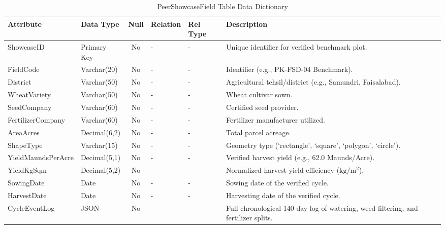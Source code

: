\documentclass{FastFyp}
\begin{document}
\begin{table}[H]
\footnotesize
\centering
\caption{PeerShowcaseField Table Data Dictionary}
\label{tab:showcase_table}
\begin{tabular}{|l|l|c|l|l|p{4.5cm}|}
\hline
\textbf{Attribute} & \textbf{Data Type} & \textbf{Null} & \textbf{Relation} & \textbf{Rel Type} & \textbf{Description} \\ \hline
ShowcaseID & Primary Key & No & - & - & Unique identifier for verified benchmark plot. \\ \hline
FieldCode & Varchar(20) & No & - & - & Identifier (e.g., PK-FSD-04 Benchmark). \\ \hline
District & Varchar(50) & No & - & - & Agricultural tehsil/district (e.g., Samundri, Faisalabad). \\ \hline
WheatVariety & Varchar(50) & No & - & - & Wheat cultivar sown. \\ \hline
SeedCompany & Varchar(60) & No & - & - & Certified seed provider. \\ \hline
FertilizerCompany & Varchar(60) & No & - & - & Fertilizer manufacturer utilized. \\ \hline
AreaAcres & Decimal(6,2) & No & - & - & Total parcel acreage. \\ \hline
ShapeType & Varchar(15) & No & - & - & Geometry type (`rectangle', `square', `polygon', `circle'). \\ \hline
YieldMaundsPerAcre & Decimal(5,1) & No & - & - & Verified harvest yield (e.g., 62.0 Maunds/Acre). \\ \hline
YieldKgSqm & Decimal(5,2) & No & - & - & Normalized harvest yield efficiency ($\text{kg}/\text{m}^2$). \\ \hline
SowingDate & Date & No & - & - & Sowing date of the verified cycle. \\ \hline
HarvestDate & Date & No & - & - & Harvesting date of the verified cycle. \\ \hline
CycleEventLog & JSON & No & - & - & Full chronological 140-day log of watering, weed filtering, and fertilizer splits. \\ \hline
\end{tabular}
\end{table}
\end{document}
